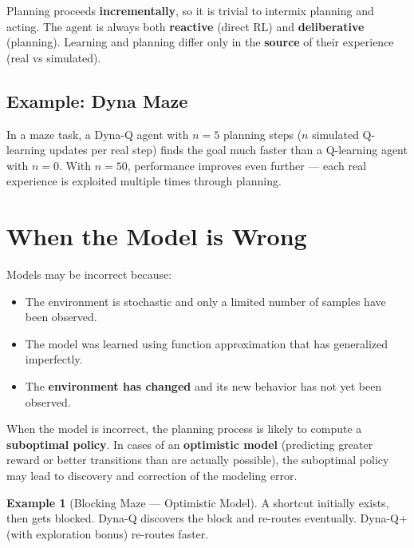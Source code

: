 \documentclass[11pt,a4paper]{article}
\theoremstyle{definition}
\newtheorem{example}{Example}[section]
\theoremstyle{plain}
\theoremstyle{remark}
\begin{document}
\begin{tcolorbox}[colback=green!5!white, colframe=green!60!black]
Planning proceeds \textbf{incrementally}, so it is trivial to intermix planning and acting. The agent is always both \textbf{reactive} (direct RL) and \textbf{deliberative} (planning). Learning and planning differ only in the \textbf{source} of their experience (real vs simulated).
\end{tcolorbox}

\subsection{Example: Dyna Maze}

In a maze task, a Dyna-Q agent with $n = 5$ planning steps ($n$ simulated Q-learning updates per real step) finds the goal much faster than a Q-learning agent with $n = 0$. With $n = 50$, performance improves even further — each real experience is exploited multiple times through planning.

\section{When the Model is Wrong}

Models may be incorrect because:
\begin{itemize}
    \item The environment is stochastic and only a limited number of samples have been observed.
    \item The model was learned using function approximation that has generalized imperfectly.
    \item The \textbf{environment has changed} and its new behavior has not yet been observed.
\end{itemize}

When the model is incorrect, the planning process is likely to compute a \textbf{suboptimal policy}. In cases of an \textbf{optimistic model} (predicting greater reward or better transitions than are actually possible), the suboptimal policy may lead to discovery and correction of the modeling error.

\begin{example}[Blocking Maze — Optimistic Model]
A shortcut initially exists, then gets blocked. Dyna-Q discovers the block and re-routes eventually. Dyna-Q+ (with exploration bonus) re-routes faster.
\end{example}
\end{document}
